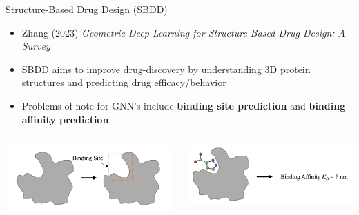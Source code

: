 \documentclass{beamer}
\begin{document}
\begin{frame}{Structure-Based Drug Design (SBDD)}
    \begin{itemize}
        \item Zhang (2023) {\it Geometric Deep Learning for Structure-Based Drug Design: A Survey} \cite{zhang_systematic_2023}
        \item SBDD aims to improve drug-discovery by understanding 3D protein structures and predicting drug efficacy/behavior %
        \item Problems of note for GNN's include {\bf binding site prediction} and {\bf binding affinity prediction}
    \end{itemize}

    \vspace{3mm}

    \begin{columns}
        \begin{column}{0.5\textwidth}
            \includegraphics[width=\textwidth]{Zhang_2023_BindingSite.png}
        \end{column}
        \begin{column}{0.5\textwidth}
            \includegraphics[width=\textwidth]{Zhang_2023_BindingAffinity.png}
        \end{column}
    \end{columns}
\end{frame}
\end{document}
